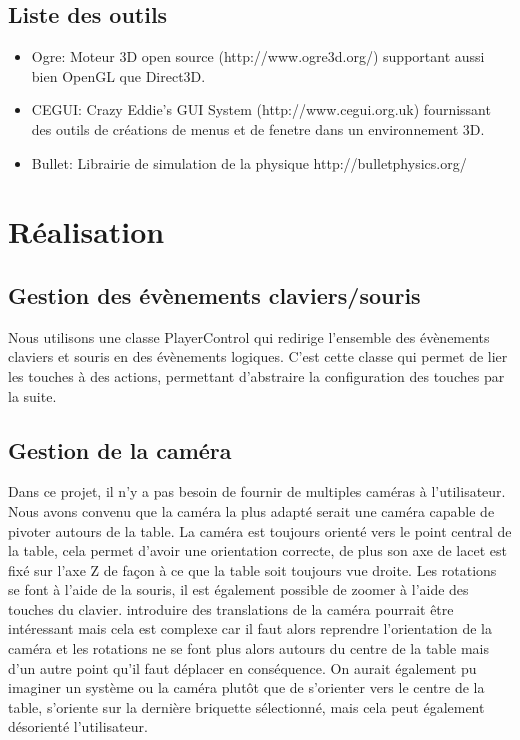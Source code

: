 \documentclass[frenchb,twoside]{EPURapport}
\begin{document}
    \section{Liste des outils}
    \begin{itemize}
        \item Ogre: Moteur 3D open source (http://www.ogre3d.org/) supportant aussi bien OpenGL que Direct3D. 
        \item CEGUI: Crazy Eddie's GUI System (http://www.cegui.org.uk) fournissant des outils de créations de menus et de fenetre dans un environnement 3D.
        \item Bullet: Librairie de simulation de la physique http://bulletphysics.org/
    \end{itemize}

\chapter{Réalisation}
    \section{Gestion des évènements claviers/souris}
        Nous utilisons une classe PlayerControl qui redirige l'ensemble des
        évènements claviers et souris en des évènements logiques. C'est cette
        classe qui permet de lier les touches à des actions, permettant
        d'abstraire la configuration des touches par la suite.

    \section{Gestion de la caméra}
        Dans ce projet, il n'y a pas besoin de fournir de multiples caméras à
        l'utilisateur. Nous avons convenu que la caméra la plus adapté serait
        une caméra capable de pivoter autours de la table. La caméra est
        toujours orienté vers le point central de la table, cela permet d'avoir
        une orientation correcte, de plus son axe de lacet est fixé sur l'axe
        Z de façon à ce que la table soit toujours vue droite. Les rotations se
        font à l'aide de la souris, il est également possible de zoomer à
        l'aide des touches du clavier. introduire des translations de la caméra
        pourrait être intéressant mais cela est complexe car il faut alors
        reprendre l'orientation de la caméra et les rotations ne se font plus
        alors autours du centre de la table mais d'un autre point qu'il faut
        déplacer en conséquence. On aurait également pu imaginer un système ou
        la caméra plutôt que de s'orienter vers le centre de la table,
        s'oriente sur la dernière briquette sélectionné, mais cela peut
        également désorienté l'utilisateur.
\end{document}
